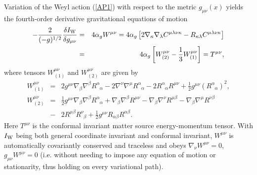 Variation of the Weyl action (\ref{AP1}) with respect to the metric $g_{\mu\nu}(x)$ yields the fourth-order derivative gravitational equations of motion \cite{mannheim_2006} \cite{mannheim_1998}
%
\begin{eqnarray}
-\frac{2}{(-g)^{1/2}}\frac{\delta I_{\rm W}}{\delta g_{\mu\nu}}&=&4\alpha_g W^{\mu\nu}=4\alpha_g\left[2\nabla_{\kappa}\nabla_{\lambda}C^{\mu\lambda\nu\kappa}-
R_{\kappa\lambda}C^{\mu\lambda\nu\kappa}\right]
\nonumber\\
&=&4\alpha_g\left[W^{\mu
	\nu}_{(2)}-\frac{1}{3}W^{\mu\nu}_{(1)}\right]=T^{\mu\nu},
\label{AP3}
\end{eqnarray}
% 
where tensors $W^{\mu \nu}_{(1)}$ and $W^{\mu \nu}_{(2)}$ are given by
%                                                                               
\begin{eqnarray}
W^{\mu \nu}_{(1)}&=&
2g^{\mu\nu}\nabla_{\beta}\nabla^{\beta}R^{\alpha}_{\phantom{\alpha}\alpha}                                             
-2\nabla^{\nu}\nabla^{\mu}R^{\alpha}_{\phantom{\alpha}\alpha}                          
-2 R^{\alpha}_{\phantom{\alpha}\alpha}R^{\mu\nu}                              
+\frac{1}{2}g^{\mu\nu}(R^{\alpha}_{\phantom{\alpha}\alpha})^2,
\nonumber\\
W^{\mu \nu}_{(2)}&=&
\frac{1}{2}g^{\mu\nu}\nabla_{\beta}\nabla^{\beta}R^{\alpha}_{\phantom{\alpha}\alpha}
+\nabla_{\beta}\nabla^{\beta}R^{\mu\nu}                    
-\nabla_{\beta}\nabla^{\nu}R^{\mu\beta}                       
-\nabla_{\beta}\nabla^{\mu}R^{\nu \beta}  
\nonumber\\            
&-& 2R^{\mu\beta}R^{\nu}_{\phantom{\nu}\beta}                                    
+\frac{1}{2}g^{\mu\nu}R_{\alpha\beta}R^{\alpha\beta}.
\label{AP4}
\end{eqnarray}     
Here $T^{\mu\nu}$ is the conformal invariant matter source energy-momentum tensor. With $I_{\rm W}$ being both general coordinate invariant and conformal invariant, $W^{\mu\nu}$ is automatically covariantly conserved and traceless and obeys $\nabla_{\nu}W^{\mu\nu}=0$, $g_{\mu\nu}W^{\mu\nu}=0$ (i.e. without needing to impose any equation of motion or stationarity, thus holding on every variational path).                            

